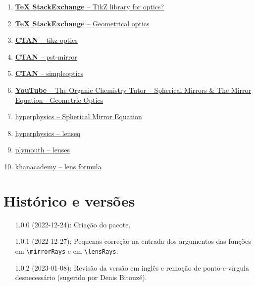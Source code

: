 \documentclass[a4paper,10pt]{article}
\begin{document}
\begin{FHZmirroLensTcolorbox}
  \begin{enumerate}
    \item \href{https://tex.stackexchange.com/q/33460/140133}{\textbf{TeX StackExchange} -- TikZ library for optics?}
    \item \href{https://tex.stackexchange.com/q/623201/140133}{\textbf{TeX StackExchange} -- Geometrical optics}
    \item \href{https://ctan.org/pkg/tikz-optics}{{\textbf{CTAN}} -- tikz-optics}
    \item \href{https://ctan.org/pkg/pst-mirror}{\textbf{CTAN} -- pst-mirror}
    \item \href{https://ctan.org/pkg/simpleoptics}{\textbf{CTAN} -- simpleoptics}

    \item \href{https://youtu.be/efPZ5uSDeuI}{\textbf{YouTube} -- The Organic Chemistry Tutor -- Spherical Mirrors \& The Mirror Equation - Geometric Optics}
    \item \href{http://hyperphysics.phy-astr.gsu.edu/hbase/geoopt/mireq.html}{hyperphysics -- Spherical Mirror Equation}

    \item \href{http://hyperphysics.phy-astr.gsu.edu/hbase/geoopt/lenseq.html}{hyperphysics -- lenseq}
    \item \href{https://www.plymouth.ac.uk/uploads/production/document/path/3/3754/PlymouthUniversity_MathsandStats_outreach_lenses.pdf}{plymouth -- lenses}
    \item \href{https://www.khanacademy.org/science/in-in-class10th-physics/in-in-10th-physics-light-reflection-refraction/in-in-lens-formula-magnification/v/lens-formula}{khanacademy -- lens formula}
  \end{enumerate}
\end{FHZmirroLensTcolorbox}

\section{Histórico e versões}

\begin{FHZmirroLensTcolorbox}
  \begin{enumerate}[leftmargin=3.5cm]
    \item[1.0.0 (2022-12-24):] Criação do pacote.
    \item[1.0.1 (2022-12-27):] Pequenas correção na entrada dos argumentos das funções em \verb|\mirrorRays| e em \verb|\lensRays|.
    \item[1.0.2 (2023-01-08):] Revisão da versão em inglês e remoção de ponto-e-vírgula desnecessário (sugerido por Denis Bitouzé).
  \end{enumerate}
\end{FHZmirroLensTcolorbox}
\end{document}
